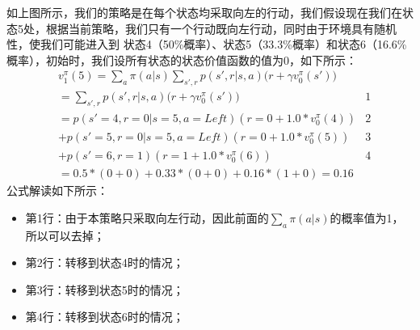 如上图所示，我们的策略是在每个状态均采取向左的行动，我们假设现在我们在状态5处，根据当前策略，我们只有一个行动既向左行动，同时由于环境具有随机性，使我们可能进入到
状态4（50\%概率）、状态5（33.3\%概率）和状态6（16.6\%概率），初始时，我们设所有状态的状态价值函数的值为0，如下所示：
\begin{equation}
\begin{aligned}
& v_{1}^{\pi}(5) = \sum_{a} \pi (a | s) \sum_{s', r} p(s', r | s, a) \bigg( r + \gamma v_{0}^{\pi}(s') \bigg) \\
& =\sum_{s', r} p(s', r | s, a) \bigg( r + \gamma v_{0}^{\pi}(s') \bigg) & 1  \\
& = p(s'=4, r=0 | s=5, a=Left) (r=0 + 1.0 * v_{0}^{\pi}(4)) & 2 \\
& + p(s'=5, r=0 | s=5, a=Left)(r=0 + 1.0*v_{0}^{\pi}(5)) & 3\\
& + p(s'=6, r=1)(r=1 + 1.0*v_{0}^{\pi}(6)) & 4 \\
& = 0.5*(0 + 0) + 0.33*(0+0) + 0.16*(1+0) = 0.16
\end{aligned}
\label{a-v-f-p-e-swf-demo}
\end{equation}
公式解读如下所示：
\begin{itemize}
    \item 第1行：由于本策略只采取向左行动，因此前面的$\sum_{a}\pi(a | s)$的概率值为1，所以可以去掉；
    \item 第2行：转移到状态4时的情况；
    \item 第3行：转移到状态5时的情况；
    \item 第4行：转移到状态6时的情况；
\end{itemize}